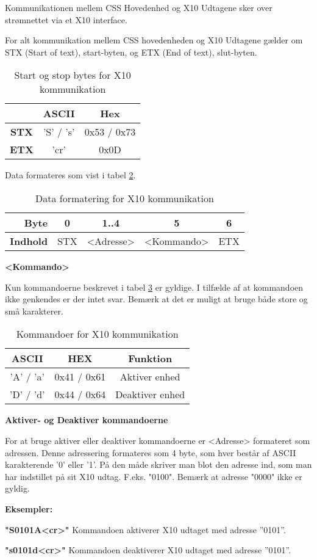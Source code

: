 Kommunikationen mellem CSS Hovedenhed og X10 Udtagene sker over strømnettet via et X10 interface.

For alt kommunikation mellem CSS hovedenheden og X10 Udtagene gælder om STX (Start of text), start-byten, og ETX (End of text), slut-byten.

\begin{table}[h]
	\caption{Start og stop bytes for X10 kommunikation}
	\centering
	\begin{tabular}{|c|c|c|}
		\hline 
		& ASCII & Hex \\ 
		\hline 
		\textbf{STX} & 'S' / 's' & 0x53 / 0x73 \\ 
		\hline 
		\textbf{ETX} & 'cr' & 0x0D \\ 
		\hline 
	\end{tabular} 
	\label{table:X10StartStopBytes}
\end{table}

Data formateres som vist i tabel \ref{table:X10DataFormat}.

\begin{table}[h]
	\caption{Data formatering for X10 kommunikation}
	\centering
	\begin{tabular}{|r|c|c|c|c|}
		\hline 
		\textbf{Byte} & 0 & 1..4 & 5 & 6 \\ 
		\hline 
		\textbf{Indhold} & STX & <Adresse> & <Kommando> & ETX \\ 
		\hline 
	\end{tabular} 
	\label{table:X10DataFormat}
\end{table}

\textbf{<Kommando>}

Kun kommandoerne beskrevet i tabel \ref{tabel:X10Kommandoer} er gyldige. I tilfælde af at kommandoen ikke genkendes er der intet svar. Bemærk at det er muligt at bruge både store og små karakterer.

\begin{table}[h]
\caption{Kommandoer for X10 kommunikation}
\center
\begin{tabular}{|c|c|c|}
\hline 
\textbf{ASCII} & \textbf{HEX} & \textbf{Funktion} \\ 
\hline 
'A' / 'a' & 0x41 / 0x61 & Aktiver enhed \\ 
\hline 
'D' / 'd' & 0x44 / 0x64 & Deaktiver enhed \\ 
\hline
\end{tabular}
\label{tabel:X10Kommandoer}
\end{table} 

\textbf{Aktiver- og Deaktiver kommandoerne}

For at bruge aktiver eller deaktiver kommandoerne er <Adresse> formateret som adressen. Denne adressering formateres som 4 byte, som hver består af ASCII karakterende '0' eller '1'. På den måde skriver man blot den adresse ind, som man har indstillet på sit X10 udtag. F.eks. "0100".
Bemærk at adresse "0000" ikke er gyldig.

\textbf{Eksempler:}

\textbf{"S0101A<cr>"}
Kommandoen aktiverer X10 udtaget med adresse ''0101''.

\textbf{"s0101d<cr>"}
Kommandoen deaktiverer X10 udtaget med adresse ''0101''.

